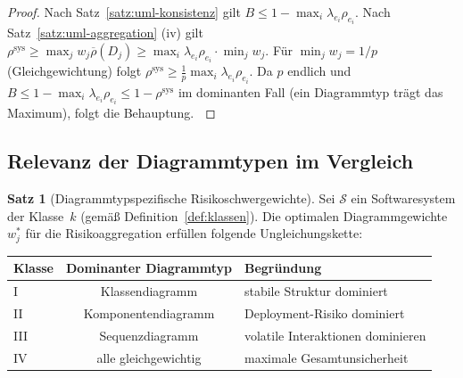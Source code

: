 ﻿\documentclass[a4paper,12pt]{article}
\theoremstyle{definition}
\newtheorem{satz}{Satz}
\newenvironment{beweis}{\begin{proof}}{\end{proof}}
\begin{document}
\begin{beweis}
    Nach Satz~\ref{satz:uml-konsistenz} gilt
    $B \leq 1 - \max_i \lambda_{e_i} \rho_{e_i}$. Nach Satz~\ref{satz:uml-aggregation}
    (iv) gilt $\rho^{\mathrm{sys}} \geq \max_j w_j \overline{\rho}(D_j) \geq
    \max_i \lambda_{e_i}\rho_{e_i} \cdot \min_j w_j$. F\"ur $\min_j w_j = 1/p$
    (Gleichgewichtung) folgt $\rho^{\mathrm{sys}} \geq \frac{1}{p}\max_i \lambda_{e_i}\rho_{e_i}$.
    Da $p$ endlich und $B \leq 1 - \max_i\lambda_{e_i}\rho_{e_i} \leq 1 - \rho^{\mathrm{sys}}$
    im dominanten Fall (ein Diagrammtyp tr\"agt das Maximum), folgt die Behauptung.
    $\qedhere$
\end{beweis}

\subsection{Relevanz der Diagrammtypen im Vergleich}

\begin{satz}[Diagrammtypspezifische Risikoschwergewichte]
\label{satz:diag-gewicht}
    Sei $\mathcal{S}$ ein Softwaresystem der Klasse~$k$ (gem\"a\ss{}
    Definition~\ref{def:klassen}). Die optimalen Diagrammgewichte $w_j^*$ f\"ur
    die Risikoaggregation erf\"ullen folgende Ungleichungskette:
    \begin{center}
    \renewcommand{\arraystretch}{1.2}
    \begin{tabular}{lcl}
        \toprule
        \textbf{Klasse} & \textbf{Dominanter Diagrammtyp} & \textbf{Begr\"undung} \\
        \midrule
        I   & Klassendiagramm & stabile Struktur dominiert \\
        II  & Komponentendiagramm & Deployment-Risiko dominiert \\
        III & Sequenzdiagramm & volatile Interaktionen dominieren \\
        IV  & alle gleichgewichtig & maximale Gesamtunsicherheit \\
        \bottomrule
    \end{tabular}
    \end{center}
\end{satz}
\end{document}
